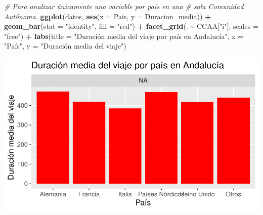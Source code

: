 \documentclass[data,article,submit,moreauthors,pdftex]{Definitions/mdpi}
\newenvironment{Shaded}{\begin{snugshade}}{\end{snugshade}}
\newcommand{\AttributeTok}[1]{\textcolor[rgb]{0.13,0.29,0.53}{#1}}
\newcommand{\CommentTok}[1]{\textcolor[rgb]{0.56,0.35,0.01}{\textit{#1}}}
\newcommand{\FunctionTok}[1]{\textcolor[rgb]{0.13,0.29,0.53}{\textbf{#1}}}
\newcommand{\NormalTok}[1]{#1}
\newcommand{\SpecialCharTok}[1]{\textcolor[rgb]{0.81,0.36,0.00}{\textbf{#1}}}
\newcommand{\StringTok}[1]{\textcolor[rgb]{0.31,0.60,0.02}{#1}}
\begin{document}
\begin{Shaded}
\begin{Highlighting}[]
\CommentTok{\# Para analizar únicamente una variable por país en una}
\CommentTok{\# sola Comunidad Autónoma.}
\FunctionTok{ggplot}\NormalTok{(datos, }\FunctionTok{aes}\NormalTok{(}\AttributeTok{x =}\NormalTok{ Pais, }\AttributeTok{y =}\NormalTok{ Duracion\_media)) }\SpecialCharTok{+} \FunctionTok{geom\_bar}\NormalTok{(}\AttributeTok{stat =} \StringTok{"identity"}\NormalTok{,}
    \AttributeTok{fill =} \StringTok{"red"}\NormalTok{) }\SpecialCharTok{+} \FunctionTok{facet\_grid}\NormalTok{(. }\SpecialCharTok{\textasciitilde{}}\NormalTok{ CCAA[}\StringTok{"i"}\NormalTok{], }\AttributeTok{scales =} \StringTok{"free"}\NormalTok{) }\SpecialCharTok{+}
    \FunctionTok{labs}\NormalTok{(}\AttributeTok{title =} \StringTok{"Duración media del viaje por país en Andalucía"}\NormalTok{,}
        \AttributeTok{x =} \StringTok{"País"}\NormalTok{, }\AttributeTok{y =} \StringTok{"Duración media del viaje"}\NormalTok{)}
\end{Highlighting}
\end{Shaded}

\includegraphics{ProyectoAED2024_Rmd_files/figure-latex/unnamed-chunk-21-3.pdf}
\end{document}
